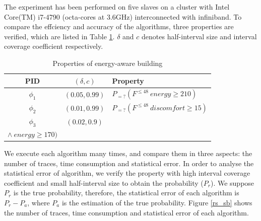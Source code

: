 The experiment has been performed on five slaves on a cluster with Intel Core(TM) i7-4790 (octa-cores at 3.6GHz) interconnected with infiniband. To compare the effciency and accuracy of the algorithms, three properties are verified, which are listed in Table \ref{tb:property}. $\delta$ and $c$ denotes half-interval size and interval coverage coefficient respectively.
\begin{table}[t]
	\renewcommand{\arraystretch}{1.2}
	\caption{Properties of energy-aware building}
	\label{tb:property}
	\centering
	\begin{tabular}{c c l}
		\hline
		~PID~ & $(\delta,c)$ & Property\\
		\hline
		$\phi_1$ & $(0.05,0.99)$ & $P_{=?}(F^{\leq48}~energy \geq 210)$ \\ 
		$\phi_2$ & $(0.01,0.99)$ & $P_{=?}(F^{\leq48}~discomfort \geq 15)$ \\
		$\phi_3$ & $(0.02,0.9)$ & 
		\tabincell{c}{$P_{=?}(F^{\leq48}~ discomfort \leq 15$ \\ $\wedge~energy \geq 170)$} \\
		\hline
	\end{tabular}
\end{table}
We execute each algorithm many times, and compare them in three aspects: the number of traces, time consumption and statistical error. In order to analyse the statistical error of algorithm, we verify the property with high interval coverage coefficient and small half-interval size to obtain the probability ($P_r$). We suppose $P_r$ is the true probability, therefore, the statistical error of each algorithm is $P_r - P_a$, where $P_a$ is the estimation of the true probability. Figure \ref{rs_sb} shows the number of traces, time consumption and statistical error of each algorithm.
